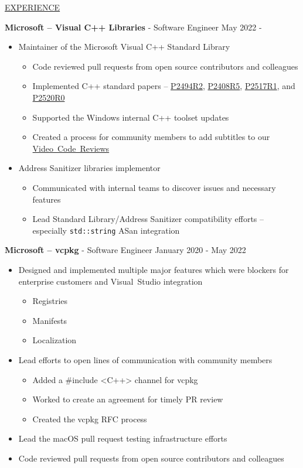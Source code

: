 \documentclass[11pt]{article}
\newcommand{\betteruline}[1]{
  \uline{#1}
}
\newcommand{\sectiontitle}[1]{
  \begingroup
    \titlebold
    \betteruline{\Large\uppercase{#1}  }
    \vspace{1.7mm}
  \endgroup
}
\newcommand{\sectioncontent}[1]{
  \begingroup
    \begin{FlushLeft}
    \vspace{-3mm}
    \sffamily\small#1
    \end{FlushLeft}
  \endgroup
  \vspace{2mm}
}
\newcommand{\job}[3]{
  \begingroup
    \textbf{\small#1} - \small#2
    \hfill\color{black!70}\small{#3}
  \endgroup
}
\newcommand{\spacevv}{
  \vspace{2mm}
}
\begin{document}
\begin{paracol}{2}
\switchcolumn

\sectiontitle{experience}
\sectioncontent{

\job{Microsoft -- Visual C++ Libraries}{Software Engineer}{May 2022 -}
\begin{itemize}
  \item Maintainer of the Microsoft Visual C++ Standard Library
  \begin{itemize}
    \item Code reviewed pull requests from open source contributors and colleagues
    \item Implemented C++ standard papers --
    \href{https://wg21.link/p2494r2}{P2494R2},
    \href{https://wg21.link/p2408r5}{P2408R5},
    \href{https://wg21.link/p2517r1}{P2517R1},
    and \href{https://wg21.link/p2520r0}{P2520R0}
    \item Supported the Windows internal C++ toolset updates
    \item Created a process for community members to add subtitles to our \href{https://github.com/microsoft/STL/wiki/Code-Review-Videos}{Video~Code~Reviews}
  \end{itemize}
  \item Address Sanitizer libraries implementor
  \begin{itemize}
    \item Communicated with internal teams to discover issues and necessary features
    \item Lead Standard Library/Address Sanitizer compatibility efforts -- especially \texttt{std::string} ASan integration
  \end{itemize}
\end{itemize}
\spacevv

\job{Microsoft -- vcpkg}{Software Engineer}{January 2020 - May 2022}
\begin{itemize}
  \item Designed and implemented multiple major features which were blockers for enterprise customers and Visual~Studio integration
  \begin{itemize}
    \item Registries
    \item Manifests
    \item Localization
  \end{itemize}
  \item Lead efforts to open lines of communication with community members
  \begin{itemize}
    \item Added a \#include <C++> channel for vcpkg
    \item Worked to create an agreement for timely PR review
    \item Created the vcpkg RFC process
  \end{itemize}
  \item Lead the macOS pull request testing infrastructure efforts
  \item Code reviewed pull requests from open source contributors and colleagues
\end{itemize}
\spacevv

}
\end{paracol}
\end{document}
